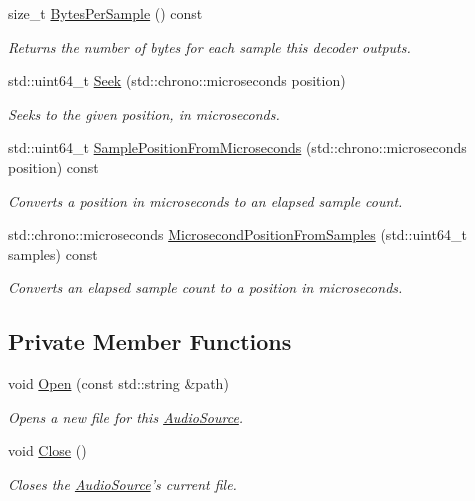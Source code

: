 \begin{DoxyCompactItemize}
size\+\_\+t \hyperlink{classAudioSource_ae6eb4d0fc3d1d60375edc2745b635818}{Bytes\+Per\+Sample} () const 
\begin{DoxyCompactList}\small\item\em Returns the number of bytes for each sample this decoder outputs. \end{DoxyCompactList}\item 
std\+::uint64\+\_\+t \hyperlink{classAudioSource_ad8639603fb59d21f5c1369707f16975c}{Seek} (std\+::chrono\+::microseconds position)
\begin{DoxyCompactList}\small\item\em Seeks to the given position, in microseconds. \end{DoxyCompactList}\item 
std\+::uint64\+\_\+t \hyperlink{classAudioSource_ac0a5d14505c36238d4a8a465122ff06e}{Sample\+Position\+From\+Microseconds} (std\+::chrono\+::microseconds position) const 
\begin{DoxyCompactList}\small\item\em Converts a position in microseconds to an elapsed sample count. \end{DoxyCompactList}\item 
std\+::chrono\+::microseconds \hyperlink{classAudioSource_aa9c0d4b60adfc1470a560bbb8e66aaf8}{Microsecond\+Position\+From\+Samples} (std\+::uint64\+\_\+t samples) const 
\begin{DoxyCompactList}\small\item\em Converts an elapsed sample count to a position in microseconds. \end{DoxyCompactList}\end{DoxyCompactItemize}
\subsection*{Private Member Functions}
\begin{DoxyCompactItemize}
\item 
void \hyperlink{classAudioSource_a9b10234d7c9f29b17008b4dc3eab2a71}{Open} (const std\+::string \&path)
\begin{DoxyCompactList}\small\item\em Opens a new file for this \hyperlink{classAudioSource}{Audio\+Source}. \end{DoxyCompactList}\item 
\hypertarget{classAudioSource_a46444de950d02ac35a695ad167fed2f4}{void \hyperlink{classAudioSource_a46444de950d02ac35a695ad167fed2f4}{Close} ()}\label{classAudioSource_a46444de950d02ac35a695ad167fed2f4}

\begin{DoxyCompactList}\small\item\em Closes the \hyperlink{classAudioSource}{Audio\+Source}'s current file. \end{DoxyCompactList}\end{DoxyCompactItemize}

